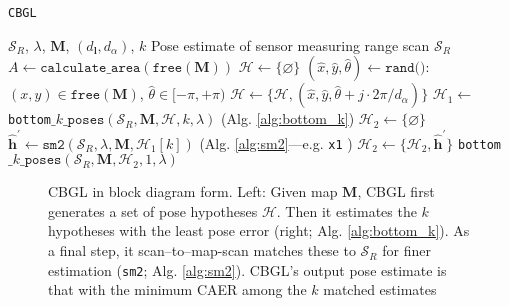 \begin{algorithm}[]
  \caption{\texttt{CBGL}}
  \begin{spacing}{1.0}
  \begin{algorithmic}[1]
    \REQUIRE $\mathcal{S}_R$, $\lambda$, $\bm{M}$, $(d_{\bm{l}}, d_\alpha)$, $k$
    \ENSURE Pose estimate of sensor measuring range scan $\mathcal{S}_R$ %
    \STATE $A \leftarrow \texttt{calculate\_area}(\texttt{free}(\bm{M}))$
    \STATE $\mathcal{H} \leftarrow \{\varnothing\}$
      \STATE \small $(\hat{x},\hat{y},\hat{\theta}) \leftarrow \texttt{rand()}$: $(x,y) \in \texttt{free}(\bm{M})$, $\hat{\theta} \in [-\pi,+\pi)$
        \STATE $\mathcal{H} \leftarrow \{\mathcal{H}, (\hat{x}, \hat{y}, \hat{\theta} + j \cdot 2\pi / d_{\alpha})\}$     \label{alg:cbgl:h}
      \ENDFOR
    \ENDFOR
    \STATE $\mathcal{H}_1 \leftarrow$ \texttt{bottom}$\_k\_\texttt{poses}(\mathcal{S}_R, \bm{M}, \mathcal{H}, k, \lambda)$ \hfill {\small (Alg. \ref{alg:bottom_k}}) \label{alg:cbgl:h1}
    \STATE $\mathcal{H}_2 \leftarrow \{\varnothing \}$
      \STATE $\hat{\bm{h}}^\prime \leftarrow \texttt{sm2}(\mathcal{S}_R, \lambda, \bm{M}, \mathcal{H}_1[k])$ \hfill {\small (Alg. \ref{alg:sm2}---e.g. \texttt{x1} \cite{Filotheou2023a}})
      \STATE $\mathcal{H}_2 \leftarrow \{\mathcal{H}_2, \hat{\bm{h}}^\prime\}$  \label{alg:cbgl:h2}
    \ENDFOR
    \RETURN \texttt{bottom}$\_k\_\texttt{poses}(\mathcal{S}_R, \bm{M}, \mathcal{H}_2, 1, \lambda)$
  \end{algorithmic}
  \end{spacing}
  \label{alg:cbgl}
\end{algorithm}




\begin{figure}\vspace{-0.4cm}
  \subfloat{\label{fig:cbgl}     }
  \subfloat{\label{fig:bottom_k} }
  \caption{\small CBGL in block diagram form. Left: Given map $\bm{M}$, CBGL
           first generates a set of pose hypotheses $\mathcal{H}$. Then it
           estimates the $k$ hypotheses with the least pose error (right; Alg.
           \ref{alg:bottom_k}).
           As a final step, it scan--to--map-scan
           matches these to $\mathcal{S}_R$ for finer estimation
           (\texttt{sm2}; Alg.
           \ref{alg:sm2}).
           CBGL's output pose estimate is that with
           the minimum CAER among the $k$ matched estimates
           }
  \label{fig:block_system}
\end{figure}





